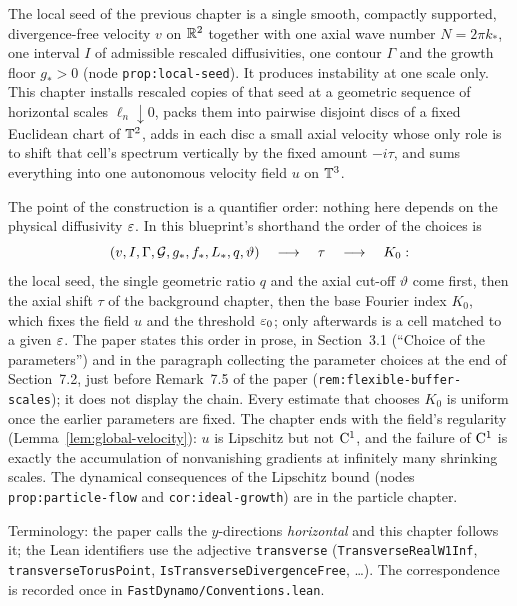 
The local seed of the previous chapter is a single smooth, compactly supported,
divergence-free velocity $v $ on $\mathbb{R}^2 $ together with one axial wave number
$N=2\pi k_* $, one interval $I $ of admissible rescaled diffusivities, one contour
$\Gamma $ and the growth floor $g_*>0 $ (node \texttt{prop:local-seed}).  It produces
instability at one scale only.  This chapter installs rescaled copies of that seed at a
geometric sequence of horizontal scales $\ell_n\downarrow0 $, packs them into pairwise
disjoint discs of a fixed Euclidean chart of $\mathbb{T}^2 $, adds in each disc a small axial
velocity whose only role is to shift that cell's spectrum vertically by the fixed amount
$-i\tau $, and sums everything into one autonomous velocity field $u $ on $\mathbb{T}^3 $.

The point of the construction is a quantifier order: nothing here depends on the physical
diffusivity $\varepsilon $.  In this blueprint's shorthand the order of the choices is
\[
  (v,I,\Gamma,\mathcal{G},g_*,f_*,L_*,q,\vartheta)
  \quad\longrightarrow\quad\tau
  \quad\longrightarrow\quad K_0 :
\]
the local seed, the single geometric ratio $q $ and the axial cut-off
$\vartheta $ come first, then the axial shift $\tau $ of the background chapter, then the
base Fourier index $K_0 $, which fixes the field $u $ and the threshold $\varepsilon_0 $; only
afterwards is a cell matched to a given $\varepsilon $.  The paper states this order in prose, in
Section~3.1 (``Choice of the parameters'') and in the paragraph collecting the parameter choices at
the end of Section~7.2, just before Remark~7.5 of the paper (\texttt{rem:flexible-buffer-scales});
it does not display the chain.  Every estimate that chooses $K_0 $ is uniform once the
earlier parameters are fixed.  The chapter ends
with the field's regularity (Lemma~\ref{lem:global-velocity}): $u $ is Lipschitz but not
$\mathrm{C}^1 $, and the failure of $\mathrm{C}^1 $ is exactly the accumulation of nonvanishing gradients at
infinitely many shrinking scales.  The dynamical consequences of the Lipschitz bound
(nodes \texttt{prop:particle-flow} and \texttt{cor:ideal-growth}) are in the particle
chapter.

Terminology: the paper calls the $y $-directions \emph{horizontal} and this chapter
follows it; the Lean identifiers use the adjective \texttt{transverse}
(\texttt{TransverseRealW1Inf}, \texttt{transverseTorusPoint},
\texttt{IsTransverseDivergenceFree}, \dots).  The correspondence is recorded once in
\texttt{FastDynamo/Conventions.lean}.

